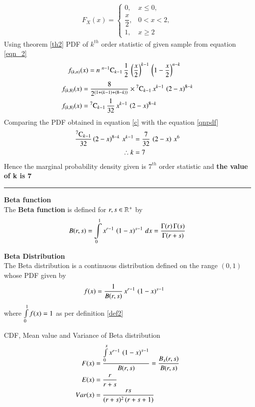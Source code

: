 \documentclass[journal,12pt,twocolumn]{IEEEtran}
\begin{document}
 \begin{align}
 F_{X}(x) = 
 \begin{cases}
      0,             &x \leq 0, \\ 
  \dfrac{x}{2},      &0 < x< 2, \\ 
     1,              & x\geq2
 \end{cases} \label{e}
 \end{align}
Using theorem \eqref{th2} PDF of $k^{th}$ order statistic of given sample from equation \eqref{eqn_2}
\begin{align}
f_{(k,n)}(x) &= n\;{}^{n-1}\mathrm{C}_{k-1}\,\dfrac{1}{2}\,\left(\dfrac{x}{2}\right)^{k-1}\,\left(1-\dfrac{x}{2}\right)^{n-k} 
\end{align}
\begin{align}
f_{(k,8)}(x) &= \dfrac{8}{2^{(1+(k-1)+(8-k))}}\times{}^{7}\mathrm{C}_{k-1}\,x^{k-1}\,\left(2-x\right)^{8-k}\\
f_{(k,8)}(x) &= {}^{7}\mathrm{C}_{k-1}\,\dfrac{1}{32}\,x^{k-1}\,\left(2-x\right)^{8-k} \label{c}
 \end{align}
Comparing the PDF obtained in equation \eqref{c} with the equation \eqref{qnpdf}
\begin{align}
\dfrac{{}^{7}\mathrm{C}_{k-1}}{32}\left(2-x\right)^{8-k}\,x^{k-1} &= \dfrac{7}{32}\,\left(2-x\right)\,x^6 \\
\therefore k &= 7 
\end{align}
Hence the marginal probability density given is $7^{th}$ order statistic and 
\textbf{the value of k is 7} 
\vspace{0.5cm}
\hrule
\vspace{0.5cm}
\begin{definition}
\textbf{Beta function}\\
\label{def2}
 The \textbf{Beta function} is defined for $r, s \in \mathbb{R}^{+}$ by 
\begin{equation}
B(r,s) = \int\limits_{0}^{1} x^{r-1}\,\left(1-x\right)^{s-1}\,dx = \dfrac{\Gamma(r)\,\Gamma(s)}{\Gamma(r+s)} 
\label{eqn_5}
\end{equation}
\end{definition}

\begin{definition}
\label{bddef}
\textbf{Beta Distribution} \\
The Beta distribution is a continuous distribution defined on the range $(0,1)$ whose PDF given by 
\begin{align}
f(x) &= \dfrac{1}{B(r,s)}\,x^{r-1}\,\left(1-x\right)^{s-1} 
\end{align}
where $\int\limits_{0}^1f(x) = 1$ as per definition \eqref{def2} 

CDF, Mean value and Variance of Beta distribution
\begin{align}
 F(x)   &=\dfrac{\int\limits_{0}^{x}x^{r-1}\,\left(1-x\right)^{s-1}}{B(r,s)} =    \dfrac{B_{x}(r,s)}{B(r,s)} \\
 E(x)   &=   \dfrac{r}{r+s} \\
 Var(x) &= \dfrac{rs}{(r+s)^{2}\,(r+s+1)}
\end{align}
\end{definition}
\end{document}
